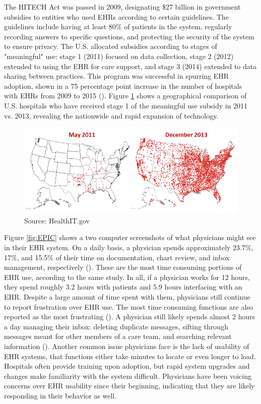\documentclass[11pt]{article}
\begin{document}
The HITECH Act was passed in 2009, designating \$27 billion in government subsidies to entities who used EHRs according to certain guidelines. The guidelines include having at least 80\% of patients in the system, regularly recording answers to specific questions, and protecting the security of the system to ensure privacy. The U.S. allocated subsidies according to stages of "meaningful" use: stage 1 (2011) focused on data collection, stage 2 (2012) extended to using the EHR for care support, and stage 3 (2014) extended to data sharing between practices. This program was successful in  spurring EHR adoption, shown in a 75 percentage point increase in the number of hospitals with EHRs from 2009 to 2015 (\cite{stats}). Figure \ref{fig:meanuse} shows a geographical comparison of U.S. hospitals who have received stage 1 of the meaningful use subsidy in 2011 vs. 2013, revealing the nationwide and rapid expansion of technology. 

\begin{figure}[ht]
    \centering
    \caption{Hospitals Receiving Meaningful Use Stage 1 Subsidy}
    \includegraphics[scale=.6]{Objects/QS-Hospitals-Receiving-Payments-for-MU-and-Adoption.png}
    \caption*{Source: HealthIT.gov}
    \label{fig:meanuse}
\end{figure}

Figure \ref{fig:EPIC} shows a two computer screenshots of what physicians might see in their EHR system. On a daily basis, a physician spends approximately 23.7\%, 17\%, and 15.5\% of their time on documentation, chart review, and inbox management, respectively (\cite{arndt2017tethered}). These are the most time consuming portions of EHR use, according to the same study. In all, if a physician works for 12 hours, they spend roughly 3.2 hours with patients and 5.9 hours interfacing with an EHR. Despite a large amount of time spent with them, physicians still continue to report frustration over EHR use. The most time consuming functions are also reported as the most frustrating (\cite{dymek2021building}). A physician still likely spends almost 2 hours a day managing their inbox: deleting duplicate messages, sifting through messages meant for other members of a care team, and searching relevant information (\cite{dymek2021building}). Another common issue physicians face is the lack of usability of EHR systems, that functions either take minutes to locate or even longer to load. Hospitals often provide training upon adoption, but rapid system upgrades and changes make familiarity with the system difficult. Physicians have been voicing concerns over EHR usability since their beginning, indicating that they are likely responding in their behavior as well.
\end{document}
